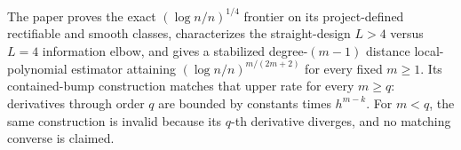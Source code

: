 The paper proves the exact \((\log n/n)^{1/4}\) frontier on its project-defined rectifiable and smooth classes, characterizes the straight-design \(L>4\) versus \(L=4\) information elbow, and gives a stabilized degree-\((m-1)\) distance local-polynomial estimator attaining \((\log n/n)^{m/(2m+2)}\) for every fixed \(m\geq1\).  Its contained-bump construction matches that upper rate for every \(m\geq q\): derivatives through order \(q\) are bounded by constants times \(h^{m-k}\).  For \(m<q\), the same construction is invalid because its \(q\)-th derivative diverges, and no matching converse is claimed.